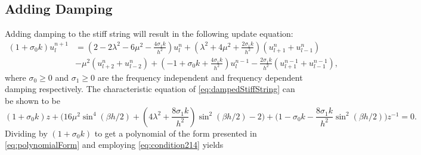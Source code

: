 \documentclass{article}
\begin{document}
\subsection{Adding Damping}\label{sec:dampedString}
Adding damping to the stiff string will result in the following update equation:
\begin{equation}\label{eq:dampedStiffString}
    \begin{aligned}
    (1+\sigma_0k)u_l^{n+1} &= (2-2\lambda^2-6\mu^2-\frac{4\sigma_1k}{h^2})u_l^n +(\lambda^2 + 4\mu^2 + \frac{2\sigma_1k}{h^2})(u_{l+1}^n+u_{l-1}^n)\\
    &-\mu^2(u_{l+2}^n+u_{l-2}^n)+(-1 + \sigma_0k+\frac{4\sigma_1k}{h^2})u_l^{n-1} -\frac{2\sigma_1k}{h^2}(u_{l+1}^{n-1}+u_{l-1}^{n-1}),
    \end{aligned}
\end{equation}
where $\sigma_0 \geq 0$ and $\sigma_1\geq0$ are the frequency independent and frequency dependent damping respectively. The characteristic equation of \eqref{eq:dampedStiffString} can be shown to be
\begin{equation}\label{eq:charDampedString}
    (1+\sigma_0k)z + \bigg(16\mu^2\sin^4(\beta h/2)+(4\lambda^2+\frac{8\sigma_1k}{h^2})\sin^2(\beta h/2) - 2\bigg)+\bigg(1-\sigma_0k-\frac{8\sigma_1k}{h^2}\sin^2(\beta h/2)\bigg)z^{-1}=0.
\end{equation}
Dividing by $(1+\sigma_0k)$ to get a polynomial of the form presented in \eqref{eq:polynomialForm} and employing \eqref{eq:condition214} yields
\end{document}
